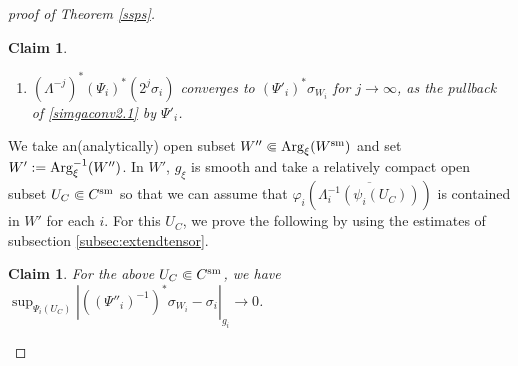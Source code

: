 \documentclass[12pt,a4paper]{amsart}
\newtheorem{Claim}[Thm]{Claim}
\theoremstyle{remark}
\theoremstyle{definition}
\begin{document}
\begin{proof}[proof of Theorem \ref{ssps}]
\begin{Claim}
\begin{enumerate}
\item \label{sigmaconv2.2}
$(\Lambda^{-j})^* (\Psi_i)^* (2^j\sigma_i)$ converges to 
$(\Psi'_i)^{*} \sigma_{W_i}$ for $j\to \infty$, as the pullback of \eqref{simgaconv2.1} 
by $\Psi'_i$. 

\end{enumerate}
\end{Claim}

We take an(analytically) open subset 
$W''\Subset {\rm Arg}_\xi(W^{\rm sm})$ 
and set $W':={\rm Arg}_\xi^{-1}(W'')$. 
In $W'$, $g_\xi$ is smooth and 
take a relatively compact open subset $U_C\Subset C^{\rm sm}$ so that 
we can assume that 
$\varphi_i(\overline{\Lambda_i^{-1}(\psi_i(U_C))})$ is contained in $W'$ for each $i$. 
For this $U_C$, we prove the following by using the estimates of 
subsection \ref{subsec:extendtensor}. 

\begin{Claim}\label{sigmaconv3}
For the above $U_C\Subset C^{\rm sm}$, we have 
$\sup_{\Psi_i(U_C)}|((\Psi''_i)^{-1})^*\sigma_{W_i}-
\sigma_{i}|_{g_i}\to 0$. 
\end{Claim}


\end{proof}
\end{document}
